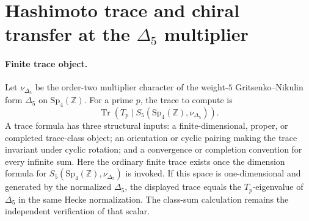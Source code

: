 \providecommand{\Sp}{\mathrm{Sp}}
\providecommand{\Z}{\mathbb{Z}}
\providecommand{\Q}{\mathbb{Q}}
\providecommand{\R}{\mathbb{R}}
\providecommand{\C}{\mathbb{C}}
\providecommand{\CoHA}{\operatorname{CoHA}}
\providecommand{\Eone}{E_1}
\providecommand{\Etwo}{E_2}
\providecommand{\hCS}{\mathrm{hCS}}
\providecommand{\Obs}{\operatorname{Obs}}
\providecommand{\Rep}{\operatorname{Rep}}
\providecommand{\cZ}{\mathcal{Z}}
\providecommand{\PhiFA}{\Phi^{\mathrm{FA}}}
\providecommand{\SpCh}{\operatorname{SpCh}}
\providecommand{\Tr}{\operatorname{Tr}}
\providecommand{\str}{\operatorname{str}}
\providecommand{\kBKM}{\kappa_{\mathrm{BKM}}}
\providecommand{\kcat}{\kappa_{\mathrm{cat}}}
\providecommand{\kch}{\kappa_{\mathrm{ch}}}
\providecommand{\kfib}{\kappa_{\mathrm{fiber}}}

\section*{Hashimoto trace and chiral transfer at the
\texorpdfstring{$\Delta_5$}{Delta5} multiplier}
\label{note:hashimoto-trace-delta5}

\paragraph{Finite trace object.}
Let \(\nu_{\Delta_5}\) be the order-two multiplier character of the
weight-\(5\) Gritsenko--Nikulin form \(\Delta_5\) on \(\Sp_4(\Z)\).
For a prime \(p\), the trace to compute is
\[
  \Tr\!\left(T_p\mid S_5(\Sp_4(\Z),\nu_{\Delta_5})\right).
\]
A trace formula has three structural inputs: a finite-dimensional,
proper, or completed trace-class object; an orientation or cyclic
pairing making the trace invariant under cyclic rotation; and a
convergence or completion convention for every infinite sum.  Here the
ordinary finite trace exists once the dimension formula for
\(S_5(\Sp_4(\Z),\nu_{\Delta_5})\) is invoked.  If this space is
one-dimensional and generated by the normalized \(\Delta_5\), the
displayed trace equals the \(T_p\)-eigenvalue of \(\Delta_5\) in the
same Hecke normalization.  The class-sum calculation remains the
independent verification of that scalar.

